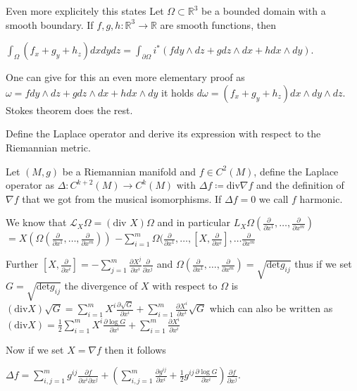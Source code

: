 Even more explicitely this states
Let \(\Omega \subset \mathbb{R}^3\) be a bounded domain with a smooth boundary. If \(f, g, h: \mathbb{R}^3 \to \mathbb{R}\) are smooth functions, then

\(\int_{\Omega} (f_x + g_y + h_z) dx dy dz = \int_{\partial \Omega} i^* (f dy \wedge dz + g dz \wedge dx + h dx \wedge dy).\)

One can give for this an even more elementary proof as 
\(\omega = f dy \wedge dz + g dz \wedge dx + h dx \wedge dy\)
it holds
\(d\omega = (f_x + g_y + h_z) dx \wedge dy \wedge dz.\)
Stokes theorem does the rest.


Define the Laplace operator and derive its expression with respect to the
Riemannian metric.

Let \( (M, g) \) be a Riemannian manifold and \( f \in C^2(M) \),
define the Laplace operator as \( \Delta : C^{k+2}(M) \to C^k(M) \)
with \( \Delta f \coloneqq \text{div} \nabla f \) 
and the definition of \( \nabla f \) that we got from the musical isomorphisms.
If \( \Delta f = 0 \) we call \( f \) harmonic.

We know that
\( \mathcal{L}_X \Omega = (\text{div } X)\Omega \)
and in particular
\( L_X \Omega (\frac{\partial}{\partial x^1}, \dots, \frac{\partial}{\partial x^m}) \)
\( = X(\Omega (\frac{\partial}{\partial x^1}, \dots, \frac{\partial}{\partial x^m}))\)
\( - \sum_{i=1}^m \Omega(\frac{\partial}{\partial x^1}, \dots, [X, \frac{\partial}{\partial x^i}], \dots \frac{\partial}{\partial x^m} \)

Further \( [X, \frac{\partial}{\partial x^i}] = - \sum_{j=1}^m \frac{\partial X^j}{\partial x^i}\frac{\partial}{\partial x^j} \)
and \( \Omega (\frac{\partial}{\partial x^1}, \dots, \frac{\partial}{\partial x^m}) = \sqrt{\text{det}g_{ij}} \)
thus if we set \( G = \sqrt{\text{det}g_{ij}} \) the divergence of \( X \) with respect to \( \Omega \) is
\( (\text{div} X)\sqrt{G} = \sum^m_{i=1} X^i \frac{\partial \sqrt{G}}{\partial x^i} + \sum^m_{i=1}\frac{\partial X^i}{\partial x^i}\sqrt{G}\)
which can also be written as 
\( (\text{div} X) = \frac{1}{2}\sum^m_{i=1} X^i \frac{\partial \log{G}}{\partial x^i} + \sum^m_{i=1}\frac{\partial X^i}{\partial x^i} \)

Now if we set \( X = \nabla f\) then it follows 

\( \Delta f = \sum^m_{i,j=1}g^{ij} \frac{\partial f}{\partial x^i \partial x^j} + (\sum^m_{i,j=1} \frac{\partial g^{ij}}{\partial x^i} + \frac{1}{2}g^{ij} \frac{\partial \log{G}}{\partial x^i}) \frac{\partial f}{\partial x^j} \).

